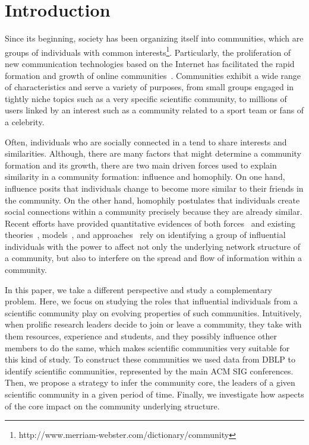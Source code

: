 \section{Introduction}

Since its beginning, society has been organizing itself into communities, which are groups of individuals with common interests\footnote{http://www.merriam-webster.com/dictionary/community}.
Particularly, the proliferation of new communication technologies based on the Internet has facilitated the rapid formation and growth of online communities~\cite{Kleinberg@cacm2008}. 
Communities exhibit a wide range of characteristics and serve a variety of purposes, from small groups engaged in tightly niche topics such as a very specific scientific community, 
to millions of users linked by an interest such as a community related to a sport team or fans of a celebrity. 

Often, individuals who are socially connected in a tend to share interests and similarities. Although, there are many factors that might determine a community formation
and its growth, there are two main driven forces used to explain similarity in a community formation: influence and homophily. On one hand, influence posits that individuals change
to become more similar to their friends in the community. On the other hand, homophily postulates that individuals create social connections within a community precisely because
they are already similar. Recent efforts have provided quantitative evidences of both forces~\cite{icwsm10cha,crandall.kdd08,Backstrom:2006,influence.correlation.kdd08} and
existing theories~\cite{Rogers.1962,accidental-influential}, models~\cite{kempe03kdd,Kempe05influentialnodes}, and
approaches~\cite{saez-trumper@kdd12,Weng:2010:TFT:1718487.1718520} rely on identifying a group of influential individuals with the power to affect not only the underlying network
structure of a community, but also to interfere on the spread and flow of information within a community. 

In this paper, we take a different perspective and study a complementary problem. Here, we focus on studying the roles that influential individuals from a scientific community play
on evolving properties of such communities. Intuitively, when prolific research leaders decide to join or leave a community, they take with them resources,
experience and students, and they possibly influence other members to do the same, which makes scientific communities very suitable for this kind of study. To construct these
communities we used data from DBLP to identify scientific communities, represented by the main ACM SIG conferences. Then, we propose a strategy to infer the community core, 
the leaders of a given scientific community in a given period of time. Finally, we investigate how aspects of the core impact on the community underlying structure. 

